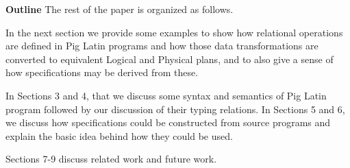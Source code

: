 \textbf{Outline} The rest of the paper is organized as follows.

In the next section we provide some examples to show how relational operations are defined in Pig Latin programs and how those data transformations are converted to equivalent Logical and Physical plans, and to also give a sense  of how specifications may be derived from these.

In Sections 3 and 4, that we discuss some syntax and semantics of Pig Latin program followed by our discussion of their typing relations. In Sections 5 and 6, we discuss how specifications could be constructed from source programs and explain the basic idea behind how they could be used.

Sections 7-9 discuss related work and future work.
